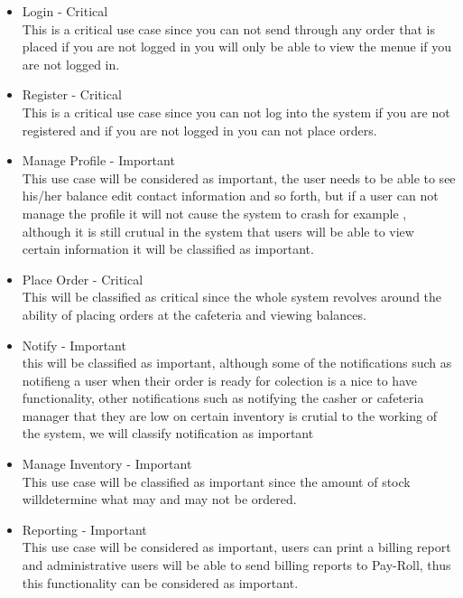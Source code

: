 \documentclass[12pt]{article}
\begin{document}
\begin{itemize}

\item Login - Critical\\
This is a critical use case since you can not send through any order that is placed if you are not logged in you will only be able to view the menue if you are not logged in.
 
\item Register - Critical\\
This is a critical use case since you can not log into the system if you are not registered and if you are not logged in you can not place orders.

\item Manage Profile - Important\\
This use case will be considered as important, the user needs to be able to see his/her balance edit contact information and so forth, but if a user can not manage the profile it will not cause the system to crash for example , although it is still crutual in the system that users will be able to view certain information it will be classified as important.

\item Place Order - Critical \\
This will be classified as critical since the whole system revolves around the ability of placing orders at the cafeteria and viewing balances. 

\item Notify - Important\\
this will be classified as important, although some of the notifications such as notifieng a user when their order is ready for colection is a nice to have functionality, other notifications such as notifying the casher or cafeteria manager that they are low on certain inventory is crutial to the working of the system, we will classify notification as important

\item Manage Inventory - Important\\
This use case will be classified as important since the amount of stock willdetermine what may and may not be ordered.

\item Reporting - Important \\ 
This use case will be considered as important, users can print a billing report and administrative users will be able to send billing reports to Pay-Roll, thus this functionality can be considered as important.


\end{itemize}
\end{document}
